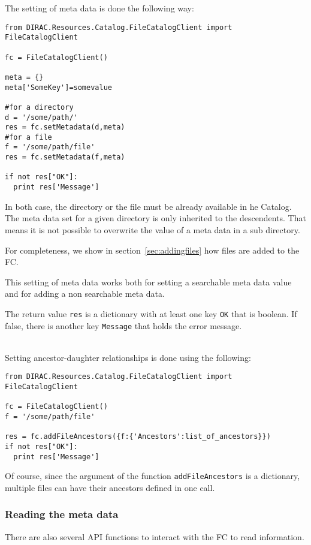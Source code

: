 \documentclass[11pt,a4paper]{scrartcl}
\begin{document}
The setting of meta data is done the following way:
\begin{lstlisting}
from DIRAC.Resources.Catalog.FileCatalogClient import FileCatalogClient

fc = FileCatalogClient()

meta = {}
meta['SomeKey']=somevalue

#for a directory
d = '/some/path/' 
res = fc.setMetadata(d,meta)
#for a file
f = '/some/path/file'
res = fc.setMetadata(f,meta)

if not res["OK"]:
  print res['Message']
\end{lstlisting}
In both case, the directory or the file must be already available in he Catalog. 
The meta data set for a given directory is only inherited to the descendents.
That means it is not possible to overwrite the value of a meta data in a sub
directory.

For completeness, we show in section~\ref{sec:addingfiles} how files are
added to the FC.

This setting of meta data works both for setting a searchable meta data value
and for adding a non searchable meta data.

The return value \lstinline|res| is a dictionary with at least one key
\lstinline|OK| that is boolean. If false, there is another key
\lstinline|Message| that holds the error message.

~\\

Setting ancestor-daughter relationships is done using the following:
\begin{lstlisting}
from DIRAC.Resources.Catalog.FileCatalogClient import FileCatalogClient

fc = FileCatalogClient()
f = '/some/path/file'

res = fc.addFileAncestors({f:{'Ancestors':list_of_ancestors}})
if not res["OK"]:
  print res['Message']
\end{lstlisting}

Of course, since the argument of the function \lstinline|addFileAncestors| is a
dictionary, multiple files can have their ancestors defined in one call.

\subsubsection{Reading the meta data}
There are also several API functions to interact with the FC to read
information. 
\end{document}
